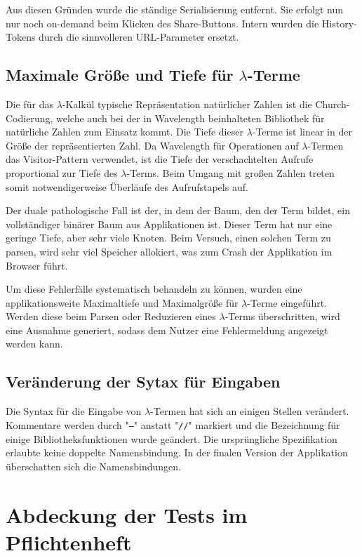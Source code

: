 \documentclass[parskip=full,11pt,openany]{scrreprt}
\begin{document}
Aus diesen Gründen wurde die ständige Serialisierung entfernt. Sie erfolgt nun nur noch on-demand beim Klicken
des Share-Buttons. Intern wurden die History-Tokens durch die sinnvolleren URL-Parameter ersetzt.

\subsection{Maximale Größe und Tiefe für $\lambda$-Terme}
Die für das $\lambda$-Kalkül typische Repräsentation natürlicher Zahlen ist die
Church-Codierung, welche auch bei der in Wavelength beinhalteten Bibliothek für
natürliche Zahlen zum Einsatz kommt. Die Tiefe dieser $\lambda$-Terme ist linear
in der Größe der repräsentierten Zahl. Da Wavelength für Operationen auf
$\lambda$-Termen das Visitor-Pattern verwendet, ist die Tiefe der
verschachtelten Aufrufe proportional zur Tiefe des $\lambda$-Terms. Beim Umgang mit großen
Zahlen treten somit notwendigerweise Überläufe des Aufrufstapels auf.

Der duale pathologische Fall ist der, in dem der Baum, den der Term bildet,
ein vollständiger binärer Baum aus Applikationen ist. Dieser Term hat nur eine
geringe Tiefe, aber sehr viele Knoten. Beim Versuch, einen solchen Term zu
parsen, wird sehr viel Speicher allokiert, was zum Crash der Applikation im
Browser führt.

Um diese Fehlerfälle systematisch behandeln zu können, wurden eine applikationsweite
Maximaltiefe und Maximalgröße für $\lambda$-Terme eingeführt. Werden diese beim Parsen oder Reduzieren
eines $\lambda$-Terms überschritten, wird eine Ausnahme generiert, sodass dem
Nutzer eine Fehlermeldung angezeigt werden kann.

\subsection{Veränderung der Sytax für Eingaben}
Die Syntax für die Eingabe von $\lambda$-Termen hat sich an einigen Stellen verändert. 
Kommentare werden durch "\texttt{--}" anstatt "\texttt{//}" markiert\label{changeComment} 
und die Bezeichnung für einige Bibliotheksfunktionen wurde geändert\label{changeBib}. 
Die ursprüngliche Spezifikation erlaubte keine doppelte Namensbindung. 
In der finalen Version der Applikation überschatten sich die Namensbindungen\label{changeBinding}.

\section{Abdeckung der Tests im Pflichtenheft}
\end{document}
